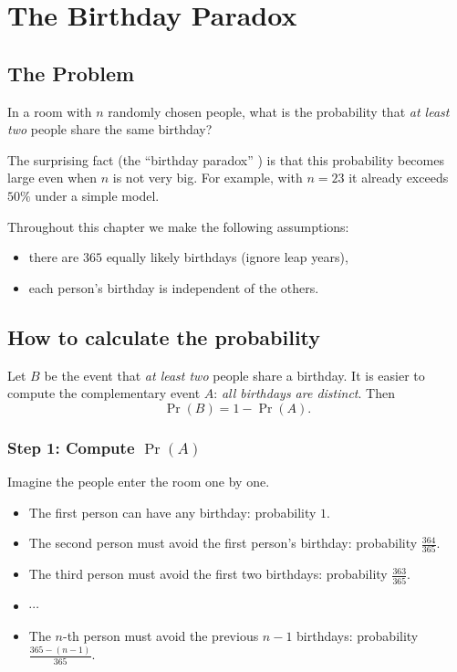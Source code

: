 \chapter{The Birthday Paradox}

\section{The Problem}
In a room with \(n\) randomly chosen people, what is the probability that
\emph{at least two} people share the same birthday?

The surprising fact (the ``birthday paradox'' \cite{wiki:birthday-problem}) is
that this probability becomes large even when \(n\) is not very big. For
example, with \(n=23\) it already exceeds \(50\%\) under a simple model.

Throughout this chapter we make the following assumptions:
\begin{itemize}
  \item there are \(365\) equally likely birthdays (ignore leap years),
  \item each person's birthday is independent of the others.
\end{itemize}

\section{How to calculate the probability}
Let \(B\) be the event that \emph{at least two} people share a birthday.
It is easier to compute the complementary event \(A\): \emph{all birthdays are
distinct}. Then
\[
  \Pr(B)=1-\Pr(A).
\]

\subsection*{Step 1: Compute \(\Pr(A)\)}
Imagine the people enter the room one by one.
\begin{itemize}
  \item The first person can have any birthday: probability \(1\).
  \item The second person must avoid the first person's birthday: probability
  \(\frac{364}{365}\).
  \item The third person must avoid the first two birthdays: probability
  \(\frac{363}{365}\).
  \item \(\cdots\)
  \item The \(n\)-th person must avoid the previous \(n-1\) birthdays:
  probability \(\frac{365-(n-1)}{365}\).
\end{itemize}

